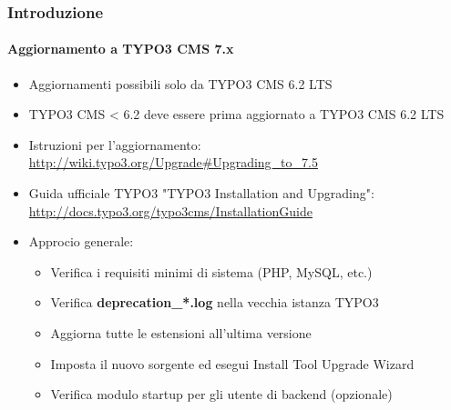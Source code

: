\begin{frame}[fragile]
	\frametitle{Introduzione}
	\framesubtitle{Aggiornamento a TYPO3 CMS 7.x}

	\begin{itemize}
		\item Aggiornamenti possibili solo da TYPO3 CMS 6.2 LTS
		\item TYPO3 CMS < 6.2 deve essere prima aggiornato a TYPO3 CMS 6.2 LTS
	\end{itemize}

	\begin{itemize}

		\item Istruzioni per l'aggiornamento:\newline
			\smaller\url{http://wiki.typo3.org/Upgrade#Upgrading_to_7.5}\normalsize
		\item Guida ufficiale TYPO3 "TYPO3 Installation and Upgrading":
			\smaller\url{http://docs.typo3.org/typo3cms/InstallationGuide}\normalsize
		\item Approcio generale:
			\begin{itemize}
				\item Verifica i requisiti minimi di sistema \small(PHP, MySQL, etc.)
				\item Verifica \textbf{deprecation\_*.log} nella vecchia istanza TYPO3
				\item Aggiorna tutte le estensioni all'ultima versione
				\item Imposta il nuovo sorgente ed esegui Install Tool \textrightarrow Upgrade Wizard
				\item Verifica modulo startup per gli utente di backend (opzionale)
			\end{itemize}
	\end{itemize}

\end{frame}

